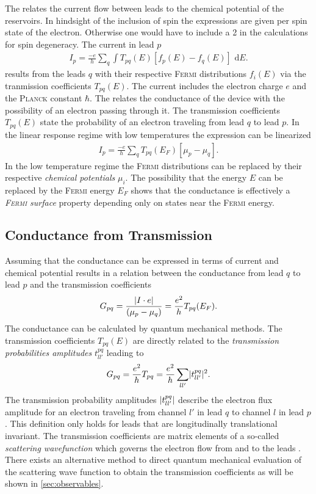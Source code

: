 The \lanbform{} relates the current flow between leads to the chemical potential of the reservoirs. In hindsight of the inclusion of spin the expressions are given per spin state of the electron. Otherwise one would have to include a 2 in the calculations for spin degeneracy. The current in lead $p$ \cite{PhysRevLett.68.2512}
\begin{align}
I_p=\frac{-e}{h} \sum_q \int T_{pq}(E) [f_p(E) - f_q(E)] \text{ d}E.
\label{eqn:current}
\end{align}
results from the leads $q$ with their respective \textsc{Fermi} distributions $f_i(E)$ via the tranmission coefficients $T_{pq}(E)$. The current includes the electron charge $e$ and the \textsc{Planck} constant $\hbar$. The \lanbform{} relates the conductance of the device with the possibility of an electron passing through it. The transmission coefficients $T_{pq}(E)$ state the probability of an electron traveling from lead $q$ to lead $p$. 
In the linear response regime with low temperatures the expression can be linearized 
\begin{align}
I_p=\frac{-e}{h} \sum_q T_{pq}(E_F) [\mu_p - \mu_q].
\label{eqn:currentlin}
\end{align}
In the low temperature regime the \textsc{Fermi} distributions can be replaced by their respective \emph{chemical potentials} $\mu_i$. The possibility that the energy $E$ can be replaced by the \textsc{Fermi} energy $E_F$ shows that the conductance is effectively a \emph{\textsc{Fermi} surface} property depending only on states near the \textsc{Fermi} energy.
\subsection{Conductance from Transmission}\label{sec:conductancefromtransmission}
Assuming that the conductance can be expressed in terms of current and chemical potential results in a relation between the conductance from lead $q$ to lead $p$ and the transmission coefficients 
\begin{align}
G_{pq}=\frac{\lvert I\cdot e\rvert}{(\mu_p - \mu_q)}=\frac{e^2}{h} T_{pq}(E_F).
\label{eqn:conductance}
\end{align}
The conductance can be calculated by quantum mechanical methods. The transmission coefficients $T_{pq}(E)$ are directly related to the \emph{transmission probabilities amplitudes} $t^{pq}_{ll'}$ leading to
\begin{align}
G_{pq}=\frac{e^2}{h} T_{pq} =\frac{e^2}{h} \sum_{ll'} \lvert t^{pq}_{ll'}\rvert^2.
\label{eqn:transcoeff}
\end{align}
The transmission probability amplitudes $\lvert t^{pq}_{ll'}\rvert$ describe the electron flux amplitude for an electron traveling from channel $l'$ in lead $q$ to channel $l$ in lead $p$. This definition only holds for leads that are longitudinally translational invariant. The transmission coefficients are matrix elements of a so-called \emph{scattering wavefunction} which governs the electron flow from and to the leads \cite{Datta1997}. There exists an alternative method to direct quantum mechanical evaluation of the scattering wave function to obtain the transmission coefficients as will be shown in \cref{sec:observables}.
